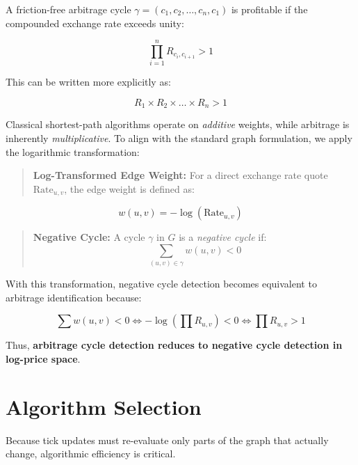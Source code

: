 \documentclass[letterpaper,11pt]{report}
\begin{document}
A friction-free arbitrage cycle $\gamma = (c_1, c_2, \dots, c_n, c_1)$ is profitable if the compounded exchange rate exceeds unity:

\begin{equation}
\prod_{i=1}^{n} R_{c_i,c_{i+1}} > 1
\end{equation}

This can be written more explicitly as:

\begin{equation}
R_{1} \times R_{2} \times \dots \times R_{n} > 1
\end{equation}

\vspace{1em}

Classical shortest-path algorithms operate on \emph{additive} weights, while arbitrage is inherently \emph{multiplicative}.  
To align with the standard graph formulation, we apply the logarithmic transformation:

\begin{quote}
\textbf{Log-Transformed Edge Weight:}  
For a direct exchange rate quote $\text{Rate}_{u,v}$, the edge weight is defined as:
\end{quote}

\begin{equation}
w(u, v) = - \log(\text{Rate}_{u,v})
\end{equation}

\vspace{1em}

\begin{quote}
\textbf{Negative Cycle:}  
A cycle $\gamma$ in $G$ is a \emph{negative cycle} if:
\[
\sum_{(u,v)\in \gamma} w(u,v) < 0
\]
\end{quote}

With this transformation, negative cycle detection becomes equivalent to arbitrage identification because:

\[
\sum w(u,v) < 0 \iff -\log\left(\prod R_{u,v}\right) < 0 \iff \prod R_{u,v} > 1
\]

Thus, \textbf{arbitrage cycle detection reduces to negative cycle detection in log-price space}.



\section{Algorithm Selection}

Because tick updates must re-evaluate only parts of the graph that actually change, algorithmic efficiency is critical.
\end{document}

